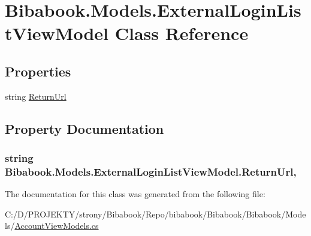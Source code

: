 \hypertarget{class_bibabook_1_1_models_1_1_external_login_list_view_model}{}\section{Bibabook.\+Models.\+External\+Login\+List\+View\+Model Class Reference}
\label{class_bibabook_1_1_models_1_1_external_login_list_view_model}
\subsection*{Properties}
\begin{DoxyCompactItemize}
\item 
string \hyperlink{class_bibabook_1_1_models_1_1_external_login_list_view_model_a337f737a83b90f444e60d7501e362915}{Return\+Url}
\end{DoxyCompactItemize}


\subsection{Property Documentation}
\hypertarget{class_bibabook_1_1_models_1_1_external_login_list_view_model_a337f737a83b90f444e60d7501e362915}{}
\subsubsection[{Return\+Url}]{\setlength{\rightskip}{0pt plus 5cm}string Bibabook.\+Models.\+External\+Login\+List\+View\+Model.\+Return\+Url\hspace{0.3cm}{\ttfamily [get]}, {\ttfamily [set]}}\label{class_bibabook_1_1_models_1_1_external_login_list_view_model_a337f737a83b90f444e60d7501e362915}


The documentation for this class was generated from the following file\+:\begin{DoxyCompactItemize}
\item 
C\+:/\+D/\+P\+R\+O\+J\+E\+K\+T\+Y/strony/\+Bibabook/\+Repo/bibabook/\+Bibabook/\+Bibabook/\+Models/\hyperlink{_account_view_models_8cs}{Account\+View\+Models.\+cs}\end{DoxyCompactItemize}
